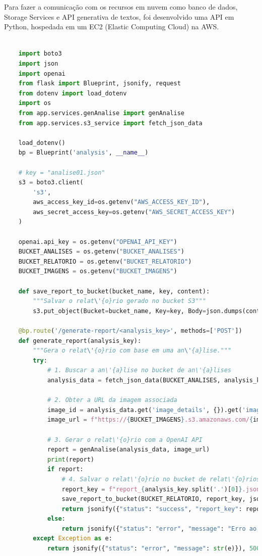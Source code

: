\documentclass[
  a4paper,%
  12pt,%
  english,%
  brazilian,%
]{article}
\begin{document}
Para fazer a comunicação com os recursos em nuvem como banco de dados, Storage Services e API generativa de textos, foi desenvolvido uma API em Python, hospedada em um EC2 (Elastic Computing Cloud) na AWS.

\begin{lstlisting}[language=Python, caption={API para gera\c{c}\~ao de relat\'{o}rios e intera\c{c}\~ao com S3}]

    import boto3
    import json
    import openai
    from flask import Blueprint, jsonify, request
    from dotenv import load_dotenv
    import os
    from app.services.genAnalise import genAnalise
    from app.services.s3_service import fetch_json_data
    
    load_dotenv()
    bp = Blueprint('analysis', __name__)
    
    # key = "analise01.json"
    s3 = boto3.client(
        's3',
        aws_access_key_id=os.getenv("AWS_ACCESS_KEY_ID"),
        aws_secret_access_key=os.getenv("AWS_SECRET_ACCESS_KEY")
    )

    openai.api_key = os.getenv("OPENAI_API_KEY")
    BUCKET_ANALISES = os.getenv("BUCKET_ANALISES")
    BUCKET_RELATORIO = os.getenv("BUCKET_RELATORIO")
    BUCKET_IMAGENS = os.getenv("BUCKET_IMAGENS")
    
    def save_report_to_bucket(bucket_name, key, content):
        """Salvar o relat\'{o}rio gerado no bucket S3"""
        s3.put_object(Bucket=bucket_name, Key=key, Body=json.dumps(content))
    
    @bp.route('/generate-report/<analysis_key>', methods=['POST'])
    def generate_report(analysis_key):
        """Gera o relat\'{o}rio com base em uma an\'{a}lise."""
        try:
            # 1. Buscar a an\'{a}lise no bucket de an\'{a}lises
            analysis_data = fetch_json_data(BUCKET_ANALISES, analysis_key)
    
            # 2. Obter a URL da imagem associada
            image_id = analysis_data.get('image_details', {}).get('image_id', '')
            image_url = f"https://{BUCKET_IMAGENS}.s3.amazonaws.com/{image_id}"
    
            # 3. Gerar o relat\'{o}rio com a OpenAI API
            report = genAnalise(analysis_data, image_url)
            print(report)
            if report:
                # 4. Salvar o relat\'{o}rio no bucket de relat\'{o}rios
                report_key = f"report_{analysis_key.split('.')[0]}.json"
                save_report_to_bucket(BUCKET_RELATORIO, report_key, json.loads(report))
                return jsonify({"status": "success", "report_key": report_key}), 200
            else:
                return jsonify({"status": "error", "message": "Erro ao gerar relat\'{o}rio"}), 500
        except Exception as e:
            return jsonify({"status": "error", "message": str(e)}), 500
    
\end{lstlisting}
\end{document}
